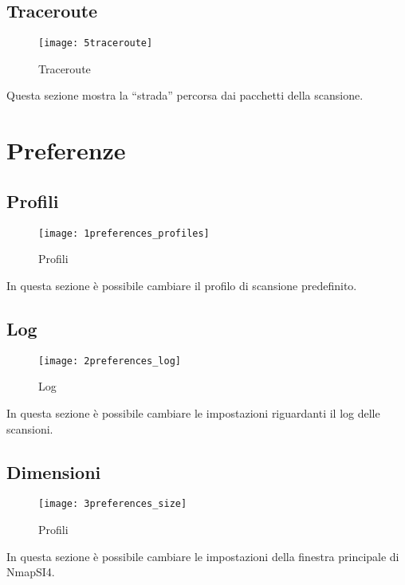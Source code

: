\section{Traceroute}
\label{sec:Traceroute}

\begin{figure}[h]
  \centering
  \texttt{[image: 5traceroute]}
  \caption{Traceroute}
  \label{fig:Traceroute}
\end{figure}
Questa sezione mostra la ``strada'' percorsa dai pacchetti della scansione.

\chapter{Preferenze}
\label{ch:Preferences}

\section{Profili}
\label{sec:profiles}

\begin{figure}[h]
  \centering
  \texttt{[image: 1preferences\_profiles]}
  \caption{Profili}
  \label{fig:Profili}
\end{figure}
In questa sezione \`e possibile cambiare il profilo di scansione predefinito.

\section{Log}
\label{sec:Log}

\begin{figure}[h]
  \centering
  \texttt{[image: 2preferences\_log]}
  \caption{Log}
  \label{fig:Log}
\end{figure}
In questa sezione \`e possibile cambiare le impostazioni riguardanti il log 
delle scansioni.

\section{Dimensioni}
\label{sec:Dimensions}

\begin{figure}[h]
  \centering
  \texttt{[image: 3preferences\_size]}
  \caption{Profili}
  \label{fig:Profili}
\end{figure}
In questa sezione \`e possibile cambiare le impostazioni della finestra 
principale di NmapSI4.


